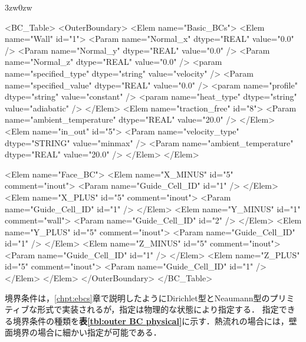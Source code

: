 \begin{indentation}{3zw}{0zw}
{ \small
\begin{program}
<BC_Table>
    <OuterBoundary>
      <Elem name="Basic_BCs">
        <Elem name="Wall" id="1">
          <Param name="Normal_x"      dtype="REAL"   value="0.0" />
          <Param name="Normal_y"      dtype="REAL"   value="0.0" />
          <Param name="Normal_z"      dtype="REAL"   value="0.0" />
          <param name="specified_type"  dtype="string" value="velocity" />
          <Param name="specified_value"    dtype="REAL"   value="0.0" />
          <param name="profile"    dtype="string" value="constant" />
          <param name="heat_type"  dtype="string" value="adiabatic" />
        </Elem>
        <Elem name="traction_free" id="8">
            <Param name="ambient_temperature"    dtype="REAL"   value="20.0" />
        </Elem>
        <Elem name="in_out" id="5">
          <Param name="velocity_type" dtype="STRING" value="minmax" />
          <Param name="ambient_temperature"    dtype="REAL"   value="20.0" />
        </Elem>
      </Elem>
    
      <Elem name="Face_BC">
        <Elem name="X_MINUS" id="5" comment="inout">
          <Param name="Guide_Cell_ID" id="1" />
        </Elem>
        <Elem name="X_PLUS"  id="5" comment="inout">
          <Param name="Guide_Cell_ID" id="1" />
        </Elem>
        <Elem name="Y_MINUS" id="1" comment="wall">
          <Param name="Guide_Cell_ID" id="2" />
        </Elem>
        <Elem name="Y_PLUS"  id="5" comment="inout">
          <Param name="Guide_Cell_ID" id="1" />
        </Elem>
        <Elem name="Z_MINUS" id="5" comment="inout">
          <Param name="Guide_Cell_ID" id="1" />
        </Elem>
        <Elem name="Z_PLUS"  id="5" comment="inout">
          <Param name="Guide_Cell_ID" id="1" />
        </Elem>
      </Elem>
    </OuterBoundary>
</BC_Table>
\end{program}
}
\end{indentation}

境界条件は，\ref{chpt:ebcs}章で説明したようにDirichlet型とNeaumann型のプリミティブな形式で実装されるが，指定は物理的な状態により指定する．
指定できる境界条件の種類を\textbf{表\ref{tbl:outer BC physical}}に示す．熱流れの場合には，壁面境界の場合に細かい指定が可能である．

